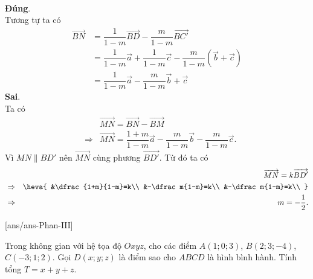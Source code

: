 \begin{ex}
{\begin{itemchoice}
\begin{eqnarray*}
 \end{eqnarray*}
 \itemch \textbf{Đúng}.\\
 Tương tự ta có
 \allowdisplaybreaks
 \begin{align*}
 \overrightarrow{BN}&=\dfrac1{1-m}\overrightarrow{BD}-\dfrac m{1-m}\overrightarrow{BC'}\\
 &=\dfrac1{1-m}\overrightarrow a+\dfrac1{1-m}\overrightarrow c-\dfrac m{1-m}(\overrightarrow b+\overrightarrow c)\\
 &=\dfrac1{1-m}\overrightarrow a-\dfrac m{1-m}\overrightarrow b+\overrightarrow c
 \end{align*}
 \itemch \textbf{Sai}.\\
 Ta có
 \allowdisplaybreaks
 \begin{eqnarray*}
 &&\overrightarrow{MN}=\overrightarrow{BN}-\overrightarrow{BM}\\
 &\Rightarrow&\overrightarrow{MN}=\dfrac{1+m}{1-m}\overrightarrow a-\dfrac m{1-m}\overrightarrow b-\dfrac m{1-m}\overrightarrow c.
 \end{eqnarray*}
 Vì $MN\parallel BD'$ nên $\overrightarrow{MN}$ cùng phương $\overrightarrow{BD'}$. Từ đó ta có
 \allowdisplaybreaks
 \begin{eqnarray*}
 &&\overrightarrow{MN}=k\overrightarrow{BD'}\\
 &\Rightarrow&\heva{
 &\dfrac{1+m}{1-m}=k\\
 &-\dfrac m{1-m}=k\\
 &-\dfrac m{1-m}=k\\
 }\\
 &\Rightarrow&m=-\dfrac12.
 \end{eqnarray*}
 \end{itemchoice}
}\end{ex}

\TNSA
{}[ans/ans\currfilebase-Phan-III]
\begin{ex}%
 Trong không gian với hệ tọa độ $Oxyz$, cho các điểm $A(1;0;3)$, $B(2;3;-4)$, $C(-3;1;2)$. Gọi $D(x;y;z)$ là điểm sao cho $ABCD$ là hình bình hành. Tính tổng $T=x+y+z$.
 \end{ex}


